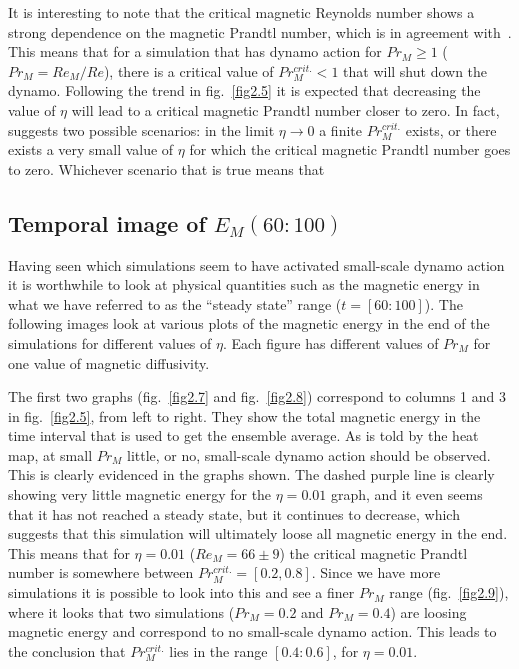\documentclass[a4paper,12pt]{article}
\begin{document}
It is interesting to note that the critical magnetic Reynolds number shows a strong dependence on the magnetic Prandtl number, which is in agreement with~\cite{schekochihin2004critical}. This means that for a simulation that has dynamo action for $Pr_M \geq 1$ ($Pr_M=Re_M/Re$), there is a critical value of $Pr_M^{crit.}<1$ that will shut down the dynamo. Following the trend in fig.~\ref{fig2.5} it is expected that decreasing the value of $\eta$ will lead to a critical magnetic Prandtl number closer to zero. In fact,~\cite{schekochihin2004critical} suggests two possible scenarios: in the limit $\eta \rightarrow 0$ a finite $Pr_M^{crit.}$ exists, or there exists a very small value of $\eta$ for which the critical magnetic Prandtl number goes to zero. Whichever scenario that is true means that 

\subsection{Temporal image of $E_M(60:100)$}

Having seen which simulations seem to have activated small-scale dynamo action it is worthwhile to look at physical quantities such as the magnetic energy in what we have referred to as the ``steady state'' range ($t = [60:100]$). The following images look at various plots of the magnetic energy in the end of the simulations for different values of $\eta$. Each figure has different values of $Pr_M$ for one value of magnetic diffusivity. 

The first two graphs (fig.~\ref{fig2.7} and fig.~\ref{fig2.8}) correspond to columns 1 and 3 in fig.~\ref{fig2.5}, from left to right. They show the total magnetic energy in the time interval that is used to get the ensemble average. As is told by the heat map, at small $Pr_M$ little, or no, small-scale dynamo action should be observed. This is clearly evidenced in the graphs shown. The dashed purple line is clearly showing very little magnetic energy for the $\eta=0.01$ graph, and it even seems that it has not reached a steady state, but it continues to decrease, which suggests that this simulation will ultimately loose all magnetic energy in the end. This means that for $\eta=0.01$ ($Re_M=66\pm9$) the critical magnetic Prandtl number is somewhere between $Pr_M^{crit.}=[0.2, 0.8]$. Since we have more simulations it is possible to look into this and see a finer $Pr_M$ range (fig.~\ref{fig2.9}), where it looks that two simulations ($Pr_M=0.2$ and $Pr_M=0.4$) are loosing magnetic energy and correspond to no small-scale dynamo action. This leads to the conclusion that $Pr_M^{crit.}$ lies in the range $[0.4:0.6]$, for $\eta=0.01$.
\end{document}
